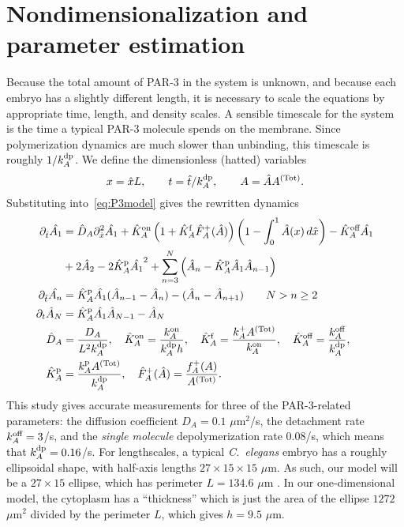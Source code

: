 \documentclass[11pt]{article}
\newcommand{\6}[1]{#1_{\text{6}}}
\newcommand{\3}[1]{#1_{\text{3}}}
\newcommand{\Tot}[1]{#1^\text{(Tot)}}
\newcommand{\A}[1]{#1_A}
\begin{document}
\section{Nondimensionalization and parameter estimation}
Because the total amount of PAR-3 in the system is unknown, and because each embryo has a slightly different length, it is necessary to scale the equations by appropriate time, length, and density scales. 
A sensible timescale for the system is the time a typical PAR-3 molecule spends on the membrane. Since polymerization dynamics are much slower than unbinding, this timescale is roughly $1/\A{\kdp}$. We define the dimensionless (hatted) variables $$x = \hat{x} L,\qquad t= \hat{t}/\A{\kdp},\qquad A= \hat{A}\Tot{A}.$$
Substituting into\ \eqref{eq:P3model} gives the rewritten dynamics \cite[Eq.~14]{lang2022oligomerization}
\begin{subequations}
\label{eq:PAR3gen}
\begin{align}
\nonumber
\Dthat \hat{\MA} & = \DhatA \Dxhat^2 \hat \MA +\KhatonA \left(1+\KhatfA \hat F_A^+(\hat A) \right)\left(1 - \int_0^1 \hat A(x) \, d\hat{x} \right)- \KhatoffA \hat{\MA} \\ 
\label{eq:Amono} &+ 2 \hat{A}_2-2\KhatpA \hat{\MA}^2+\sum_{n=3}^N \left(\hat A_n-\KhatpA \hat A_1 \hat A_{n-1}\right)  \\
\label{eq:Apoly}
\Dthat \hat{\PA} & =\KhatpA \hat{\MA} (\hat A_{n-1}-\hat A_n) - (\hat A_n-\hat A_{n+1})  \qquad N > n \geq 2 \\ 
\Dt \hat A_N & =\KhatpA\hat \MA \hat A_{N-1}- \hat A_N \\ 
\label{eq:paramsND}
\DhatA &=\frac{\A{D}}{L^2 \A{\kdp}}, \quad \KhatonA=\frac{\A{\kon}}{\A{\kdp} h }, \quad \KhatfA = \frac{\A{\kf}\Tot{A}}{\A{\kon}}, \quad  \KhatoffA = \frac{\koff_A}{\A{\kdp}}, \\ \nonumber \KhatpA &= \frac{\A{\kp} \Tot{A}}{\A{\kdp}},\quad \hat F_A^+(\hat A) =\frac{\A{f}^+(A)}{\Tot{A}}.
\end{align}
\end{subequations}
This study gives accurate measurements for three of the PAR-3-related parameters: the diffusion coefficient $D_A=0.1$ $\mu$m$^2$/s, the detachment rate $k^\text{off}_{A}=3$/s, and the \emph{single molecule} depolymerization rate $0.08$/s, which means that $k^\text{dp}_A=0.16$/s. For lengthscales, a typical \emph{C.\ elegans} embryo has a roughly ellipsoidal shape, with half-axis lengths $27 \times 15 \times 15$ $\mu$m. As such, our model will be a $27 \times 15$ ellipse, which has perimeter $L=134.6$ $\mu$m \cite{goehring2011polarization}. In our one-dimensional model, the cytoplasm has a ``thickness'' which is just the area of the ellipse $1272$ $\mu$m$^2$ divided by the perimeter $L$, which gives $h=9.5$ $\mu$m.
\end{document}
